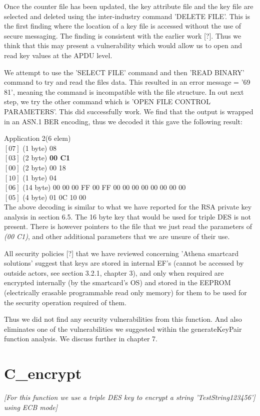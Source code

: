 \documentclass[bsc,frontabs,twoside,singlespacing,parskip,deptreport]{infthesis}     %
\begin{document}
Once the counter file has been updated, the key attribute file and the key file are selected and deleted using the inter-industry command 'DELETE FILE'. This is the first finding where the location of a key file  is accessed without the use of secure messaging. The finding is consistent with the earlier work [?]. Thus we think that this may present a vulnerability which would allow us to open and read key values at the APDU level. 

We attempt to use the 'SELECT FILE' command and then 'READ BINARY' command to try and read the files data. This resulted in an error message = '69 81', meaning the command is incompatible with the file structure. In out next step, we try the other command which is 'OPEN FILE CONTROL PARAMETERS'. This did successfully work. We find that the output is wrapped in an ASN.1 BER encoding, thus we decoded it this gave the following result:

Application 2(6 elem)\\
$[07]$ (1 byte) 08\\
$[03]$ (2 byte) \textbf{00 C1}\\
$[00]$ (2 byte) 00 18\\
$[10]$ (1 byte) 04\\
$[06]$ (14 byte) 00 00 00 FF 00 FF 00 00 00 00 00 00 00 00\\
$[05]$ (4 byte) 01 0C 10 00\\

The above decoding is similar to what we have reported for the RSA private key analysis in section 6.5. The 16 byte key that would be used for triple DES is not present. There is however pointers to the file that we just read the parameters of \textit{(00 C1)}, and other additional parameters that we are unsure of their use. 

All security policies [?] that we have reviewed concerning 'Athena smartcard solutions' suggest that keys are stored in internal EF's (cannot be accessed by outside actors, see section 3.2.1, chapter 3), and only when required are encrypted internally (by the smartcard's OS) and stored in the EEPROM (electrically erasable programmable read only memory) for them to be used for the security operation required of them. 

Thus we did not find any security vulnerabilities from this function. And also eliminates one of the vulnerabilities we suggested within the generateKeyPair function analysis. We discuss further in chapter 7.

\section{C\_encrypt}
\textit{[For this function we use a triple DES key to encrypt a string 'TestString123456'] using ECB mode]}
\end{document}

